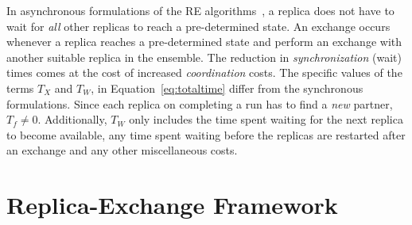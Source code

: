 \documentclass{rspublic}
\newcommand{\jhanote}[1]{ {\textcolor{red} { ***shantenu: #1 }}}
\newcommand{\alnote}[1]{ {\textcolor{blue} { ***andre: #1 }}}
\newcommand{\athotanote}[1]{ {\textcolor{green} { ***athota: #1 }}}
\newcommand{\alnote}[1]{}
\newcommand{\athotanote}[1]{}
\newcommand{\jhanote}[1]{}
\begin{document}

In asynchronous formulations of the RE
algorithms~\citep{parashar_arepex,DBLP:journals/jcc/GallicchioLP08}, a
replica does not have to wait for {\it all} other replicas to reach a
pre-determined state. An exchange occurs whenever a replica reaches a
pre-determined state and perform an exchange with another suitable
replica in the ensemble.  The reduction in {\it synchronization}
(wait) times comes at the cost of increased {\it coordination} costs.
The specific values of the terms $T_{X}$ and $T_W$, in
Equation~\ref{eq:totaltime} differ from the synchronous formulations.
Since each replica on completing a run has to find a {\it new}
partner, $T_f \neq 0$.  Additionally, $T_W$ only includes the time
spent waiting for the next replica to become available, any time spent
waiting before the replicas are restarted after an exchange and any
other miscellaneous costs.




\section{Replica-Exchange Framework}\label{repexfw}
\end{document}
